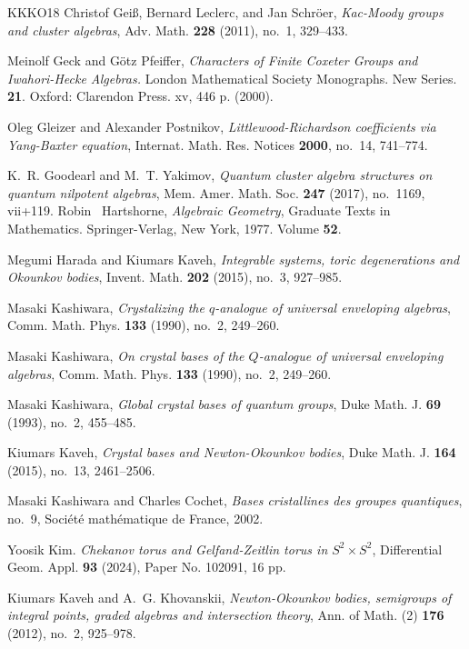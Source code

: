 \documentclass[11pt]{amsart}
\numberwithin{equation}{section}
\theoremstyle{plain}
\theoremstyle{definition}
\numberwithin{equation}{section}
\begin{document}
\begin{thebibliography}{KKKO18}
Christof Gei\ss, Bernard Leclerc, and Jan Schr\"{o}er, \emph{Kac-{M}oody groups
  and cluster algebras}, Adv. Math. \textbf{228} (2011), no.~1, 329--433.

Meinolf Geck and G\"{o}tz Pfeiffer, \emph{Characters of Finite Coxeter Groups and Iwahori-Hecke Algebras.
} London Mathematical Society Monographs. New Series. \textbf{21}. Oxford: Clarendon Press. xv, 446 p. (2000).

Oleg Gleizer and Alexander Postnikov, \emph{Littlewood-Richardson coefficients via Yang-Baxter equation}, Internat. Math. Res. Notices {\bf 2000}, no.~14, 741--774.

K.~R. Goodearl and M.~T. Yakimov, \emph{Quantum cluster algebra structures on
  quantum nilpotent algebras}, Mem. Amer. Math. Soc. \textbf{247} (2017),
  no.~1169, vii+119. 
 Robin ~Hartshorne, {\em Algebraic Geometry}, Graduate Texts in Mathematics. Springer-Verlag, New York, 1977. Volume \textbf{52}.

Megumi Harada and Kiumars Kaveh, \emph{Integrable systems, toric degenerations
  and {O}kounkov bodies}, Invent. Math. \textbf{202} (2015), no.~3, 927--985.

Masaki Kashiwara, \emph{Crystalizing the $q$-analogue of universal enveloping algebras}, Comm. Math. Phys. \textbf{133} (1990), no.~2, 249--260.

Masaki Kashiwara, \emph{On crystal bases of the $Q$-analogue of universal enveloping algebras}, Comm. Math. Phys. \textbf{133} (1990), no.~2, 249--260.

Masaki Kashiwara, \emph{Global crystal bases of quantum groups}, Duke Math. J. \textbf{69} (1993), no.~2, 455--485.

Kiumars Kaveh, \emph{Crystal bases and {N}ewton-{O}kounkov bodies}, Duke Math.
  J. \textbf{164} (2015), no.~13, 2461--2506. 

Masaki Kashiwara and Charles Cochet, \emph{Bases cristallines des groupes
  quantiques}, no.~9, Soci{\'e}t{\'e} math{\'e}matique de France, 2002.
  
Yoosik Kim. \emph{Chekanov torus and Gelfand-Zeitlin torus in $S^2 \times S^2$}, Differential Geom. Appl. {\bf 93} (2024), Paper No. 102091, 16 pp.

Kiumars Kaveh and A.~G. Khovanskii, \emph{Newton-Okounkov bodies, semigroups of integral points, graded algebras and intersection theory}, Ann. of Math. (2) {\bf 176} (2012), no.~2, 925--978.
   

\end{thebibliography}
\end{document}
